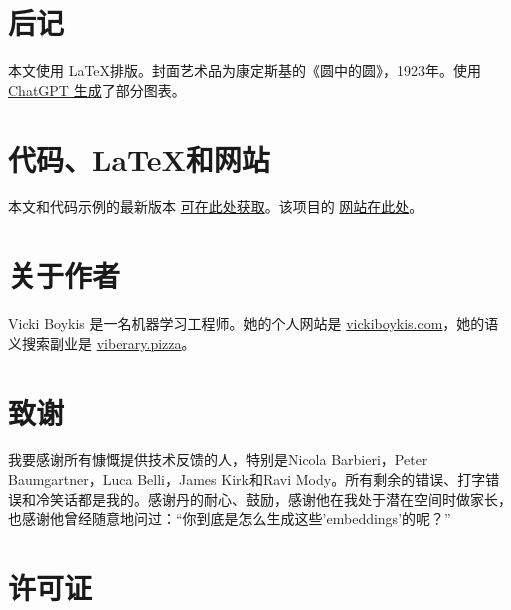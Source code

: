 \documentclass[Chinese, 11pt, table]{diazessay} %
\begin{document}
\begin{CJK}{UTF8}{gbsn}
\begin{sloppypar}
\begin{abstract}
\end{abstract}

\section*{后记}
本文使用 \LaTeX 排版。封面艺术品为康定斯基的《圆中的圆》，1923年。使用 \href{https://vickiboykis.com/2023/02/26/what-should-you-use-chatgpt-for/}{ChatGPT 生成}了部分图表。

\section*{代码、\LaTeX 和网站}
本文和代码示例的最新版本 \href{https://github.com/veekaybee/what_are_embeddings}{可在此处获取}。该项目的 \href{http://vickiboykis.com/what_are_embeddings/}{网站在此处}。

\section*{关于作者}
Vicki Boykis 是一名机器学习工程师。她的个人网站是 \href{https://www.vickiboykis.com}{vickiboykis.com}，她的语义搜索副业是 \href{https://viberary.pizza}{viberary.pizza}。


\section*{致谢}
我要感谢所有慷慨提供技术反馈的人，特别是Nicola Barbieri，Peter Baumgartner，Luca Belli，James Kirk和Ravi Mody。所有剩余的错误、打字错误和冷笑话都是我的。感谢丹的耐心、鼓励，感谢他在我处于潜在空间时做家长，也感谢他曾经随意地问过：“你到底是怎么生成这些'embeddings'的呢？”

\section*{许可证}
\doclicenseThis
\newpage

\tableofcontents
\newpage





\end{sloppypar}
\end{CJK}
\end{document}
